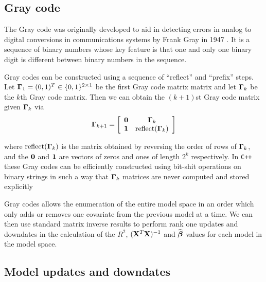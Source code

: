  
\subsection{Gray code} 
\label{sec:GrayCode}


The Gray code was originally developed to aid in detecting errors in analog to digital conversions in
communications systems by Frank Gray in 1947 \cite[][Section 22.3]{PressEtal2007}. It is a sequence of binary numbers whose key feature is that
one and only one binary digit is different between binary numbers in the sequence. 

Gray codes can be constructed using a sequence of ``reflect'' and ``prefix'' steps.
Let ${\boldsymbol \Gamma}_1 = (0,1)^T \in \{0,1\}^{2\times 1}$ be the first Gray code matrix matrix and let ${\boldsymbol \Gamma}_k$ be the $k$th Gray code matrix. Then we can obtain the $(k+1)$st Gray code matrix given ${\boldsymbol \Gamma}_k$ via 
$$
\displaystyle {\boldsymbol\Gamma}_{k+1} = \left[\begin{array}{cc}
{\bf0} & {\boldsymbol \Gamma}_k \\
{\bf 1}  & \mbox{reflect}({\boldsymbol \Gamma}_k)
\end{array} \right]
$$ 

\noindent where $\mbox{reflect}({\boldsymbol \Gamma}_k)$ is the matrix obtained by reversing the order of rows of ${\boldsymbol \Gamma}_k$, and the ${\bf 0}$ and ${\bf 1}$ are vectors of zeros and ones
of length $2^k$ respectively. In {\tt C++} these Gray codes can be efficiently constructed
using bit-shit operations on binary strings in such a way that ${\boldsymbol \Gamma}_{k}$
matrices are never computed and stored explicitly

Gray codes allows the enumeration of the entire model space in an order which only adds
or removes one covariate from the previous model at a time. We can then use standard matrix
inverse results to perform rank
one updates and downdates in the calculation of the $R^2$, $({\bf X}^T{\bf X})^{-1}$ and
$\widehat{{\boldsymbol \beta}}$ values for each model in the
model space.


\subsection{Model updates and downdates} 

